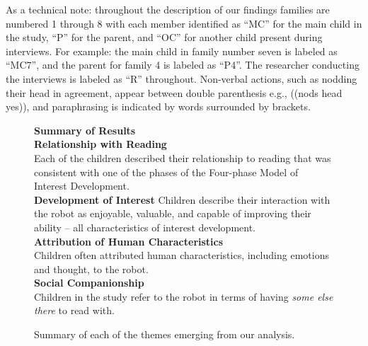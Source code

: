 \documentclass{sigchi}
\begin{document}
As a technical note: throughout the description of our findings families are numbered 1 through 8 with each member identified as ``MC'' for the main child in the study, ``P'' for the parent, and ``OC'' for another child present during interviews. For example: the main child in family number seven is labeled as ``MC7'', and the parent for family 4 is labeled as ``P4''. The researcher conducting the interviews is labeled as ``R'' throughout. Non-verbal actions, such as nodding their head in agreement, appear between double parenthesis e.g., ((nods head yes)), and paraphrasing is indicated by words surrounded by brackets.

\begin{figure}
	\vspace{2mm}
	\textbf{Summary of Results}\\
	\textbf{Relationship with Reading} \\
	Each of the children described their relationship to reading that was consistent with one of the phases of the Four-phase Model of Interest Development. \\
	
	\textbf{Development of Interest}
	Children describe their interaction with the robot as enjoyable, valuable, and capable of improving their ability -- all characteristics of interest development.\\
	
	\textbf{Attribution of Human Characteristics} \\
	Children often attributed human characteristics, including emotions and thought, to the robot.\\
	
	\textbf{Social Companionship} \\
	Children in the study refer to the robot in terms of having \textit{some else there} to read with.\\
	\caption{Summary of each of the themes emerging from our analysis.}
	\label{fig:figure4}
\end{figure}
\end{document}
